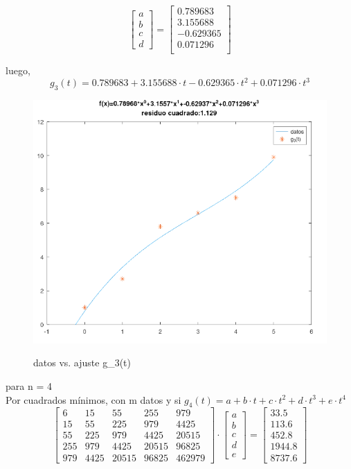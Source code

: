 \documentclass{article}
\begin{document}
\[
\begin{bmatrix}
    a \\ b \\ c \\ d
\end{bmatrix}
=
\begin{bmatrix}
    0.789683 \\
    3.155688 \\
    -0.629365\\
    0.071296 \\
\end{bmatrix}
\]

luego,
\[g_3(t)=0.789683 + 3.155688 \cdot t -0.629365 \cdot t^2 + 0.071296 \cdot t^3\]

\begin{figure}[H]
    \centering
    \includegraphics[width=0.6\linewidth]{grado.3.png}
    \label{fig:enter-label}
    \caption{datos vs. ajuste g_3(t)}
\end{figure}

para n = 4\\

Por cuadrados mínimos, con m datos y si 
$g_4(t)=a + b \cdot t + c \cdot t^2 + d \cdot t^3 + e \cdot t^4$\\

\[
\begin{bmatrix}
    6 & 15 & 55 & 255 & 979\\
    15 & 55 & 225 & 979 & 4425\\
    55 & 225 & 979 & 4425 & 20515\\
    255 & 979 & 4425 & 20515 & 96825\\
    979 & 4425 & 20515 & 96825 & 462979
\end{bmatrix}
\cdot
\begin{bmatrix}
    a \\ b \\ c \\ d \\ e
\end{bmatrix}
=
\begin{bmatrix}
    33.5 \\
    113.6 \\
    452.8 \\
    1944.8 \\
    8737.6
\end{bmatrix}
\]
\end{document}
